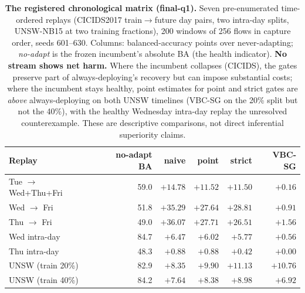 \begin{table}[t]
\centering
\caption{\textbf{The registered chronological matrix (final-q1).} Seven pre-enumerated
time-ordered replays (CICIDS2017 train$\to$future day pairs, two intra-day splits, UNSW-NB15
at two training fractions), 200 windows of 256 flows in capture order, seeds 601--630.
Columns: balanced-accuracy points over never-adapting; \emph{no-adapt} is the frozen
incumbent's absolute BA (the health indicator). \textbf{No stream shows net harm.} Where
the incumbent collapses (CICIDS), the gates preserve part of always-deploying's recovery
but can impose substantial costs; where the incumbent stays healthy, point estimates for
point and strict gates are \emph{above} always-deploying on both UNSW
timelines (VBC-SG on the 20\% split but not the 40\%), with the healthy Wednesday intra-day
replay the unresolved counterexample. These are descriptive comparisons, not direct
inferential superiority claims.}
\label{tab:chronological_q1}
\small
\begin{tabular}{l r r r r r}
\toprule
Replay & no-adapt BA & naive & point & strict & VBC-SG \\
\midrule
Tue $\to$ Wed+Thu+Fri & 59.0 & $+14.78$ & $+11.52$ & $+11.50$ & $+0.16$ \\
Wed $\to$ Fri & 51.8 & $+35.29$ & $+27.64$ & $+28.81$ & $+0.91$ \\
Thu $\to$ Fri & 49.0 & $+36.07$ & $+27.71$ & $+26.51$ & $+1.56$ \\
Wed intra-day & 84.7 & $+6.47$ & $+6.02$ & $+5.77$ & $+0.56$ \\
Thu intra-day & 48.3 & $+0.88$ & $+0.88$ & $+0.42$ & $+0.00$ \\
UNSW (train 20\%) & 82.9 & $+8.35$ & $+9.90$ & $+11.13$ & $+10.76$ \\
UNSW (train 40\%) & 84.2 & $+7.64$ & $+8.38$ & $+8.98$ & $+6.92$ \\
\bottomrule
\end{tabular}
\end{table}
